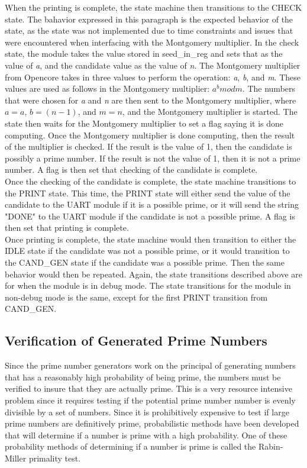 \documentclass[journal]{IEEEtran}
\begin{document}
When the printing is complete, the state machine then transitions to the CHECK state. The bahavior expressed in this paragraph is the expected behavior of the state, as the state was not implemented due to time constraints and issues that were encountered when interfacing with the Montgomery multiplier. In the check state, the module takes the value stored in seed\_in\_reg and sets that as the value of \textit{a}, and the candidate value as the value of \textit{n}. The Montgomery multiplier from Opencore takes in three values to perform the operation: \textit{a}, \textit{b}, and \textit{m}. These values are used as follows in the Montgomery multiplier: $a^b mod m$. The numbers that were chosen for \textit{a} and \textit{n} are then sent to the Montgomery multiplier, where $a = a$, $b = (n - 1)$, and $m = n$, and the Montgomery multiplier is started. The state then waits for the Montgomery multiplier to set a flag saying it is done computing. Once the Montgomery multiplier is done computing, then the result of the multiplier is checked. If the result is the value of 1, then the candidate is possibly a prime number. If the result is not the value of 1, then it is not a prime number. A flag is then set that checking of the candidate is complete.\\

Once the checking of the candidate is complete, the state machine transitions to the PRINT state. This time, the PRINT state will either send the value of the candidate to the UART module if it is a possible prime, or it will send the string "DONE" to the UART module if the candidate is not a possible prime. A flag is then set that printing is complete.\\

Once printing is complete, the state machine would then transition to either the IDLE state if the candidate was not a possible prime, or it would transition to the CAND\_GEN state if the candidate was a possible prime. Then the same behavior would then be repeated. Again, the state transitions described above are for when the module is in debug mode. The state transitions for the module in non-debug mode is the same, except for the first PRINT transition from CAND\_GEN.

\subsection{Verification of Generated Prime Numbers}
Since the prime number generators work on the principal of generating numbers that has a reasonably high probability of being prime, the numbers must be verified to insure that they are actually prime. This is a very resource intensive problem since it requires testing if the potential prime number number is evenly divisible by a set of numbers. Since it is prohibitively expensive to test if large prime numbers are definitively prime, probabilistic methods have been developed that will determine if a number is prime with a high probability. One of these probability methods of determining if a number is prime is called the Rabin-Miller primality test. \\
\end{document}
